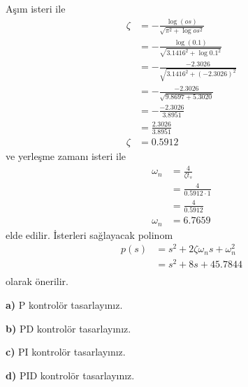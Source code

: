 Aşım isteri ile 
\begin{equation}
\begin{split}
    \zeta&=-\frac{\log(os)}{\sqrt{\pi^2+\log{os}^2}}\\
    &=-\frac{\log(0.1)}{\sqrt{3.1416^2+\log{0.1}^2}}\\
    &=-\frac{-2.3026}{\sqrt{3.1416^2+(-2.3026)^2}}\\
    &=-\frac{-2.3026}{\sqrt{9.8697+5.3020}}\\
    &=-\frac{-2.3026}{3.8951}\\
    &=\frac{2.3026}{3.8951}\\
    \zeta&=0.5912
\end{split}
\end{equation}
ve yerleşme zamanı isteri ile 
\begin{equation}
\begin{split}
    \omega_n&=\frac{4}{\zeta t_s}\\
    &=\frac{4}{0.5912\cdot 1}\\
    &=\frac{4}{0.5912}\\
    \omega_n&=6.7659
\end{split}
\end{equation}
elde edilir. İsterleri sağlayacak polinom
\begin{equation}
\begin{split}
    p(s)&=s^2+2\zeta \omega_n s+\omega_n^2\\
    &=s^2+8s+45.7844\\
\end{split}
\end{equation}
olarak önerilir.

\noindent\textbf{a)} P kontrolör tasarlayınız.

\clearpage

\noindent\textbf{b)} PD kontrolör tasarlayınız.

\clearpage

\noindent\textbf{c)} PI kontrolör tasarlayınız.

\clearpage

\noindent\textbf{d)} PID kontrolör tasarlayınız.

